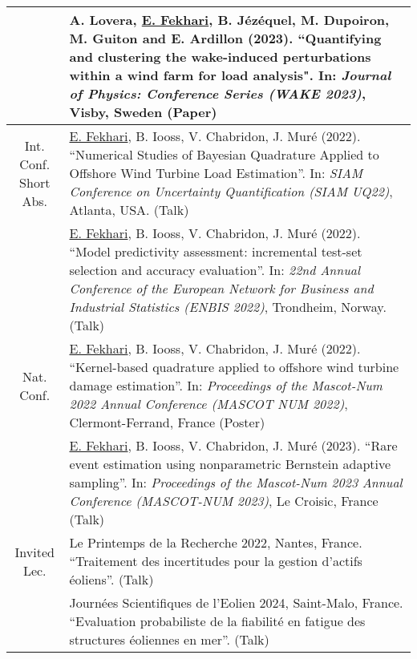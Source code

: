 \begin{center}
\begin{tabularx}{\textwidth}{c X}
                    & A. Lovera, \underline{E. Fekhari}, B. Jézéquel, M. Dupoiron, M. Guiton and E. Ardillon (2023). 
                    ``Quantifying and clustering the wake-induced perturbations within a wind farm for load analysis". 
                    In: \textit{Journal of Physics: Conference Series (WAKE 2023)}, Visby, Sweden (Paper)\\
        \hline
\shortstack{Int. Conf.\\Short Abs.}  & \underline{E. Fekhari}, B. Iooss, V. Chabridon, J. Muré (2022).
                    ``Numerical Studies of Bayesian Quadrature Applied to Offshore Wind Turbine Load Estimation''.
                    In: \textit{SIAM Conference on Uncertainty Quantification (SIAM UQ22)}, Atlanta, USA. (Talk)\\
        
                    & \underline{E. Fekhari}, B. Iooss, V. Chabridon, J. Muré (2022). 
                    ``Model predictivity assessment: incremental test-set selection and accuracy evaluation''.
                    In: \textit{22nd Annual Conference of the European Network for Business and Industrial Statistics (ENBIS 2022)}, Trondheim, Norway. (Talk)\\
        \hline
        Nat. Conf.  & \underline{E. Fekhari}, B. Iooss, V. Chabridon, J. Muré (2022).
                    ``Kernel-based quadrature applied to offshore wind turbine damage estimation''. 
                    In: \textit{Proceedings of the Mascot-Num 2022 Annual Conference (MASCOT NUM 2022)}, Clermont-Ferrand, France (Poster)\\
        
                    & \underline{E. Fekhari}, B. Iooss, V. Chabridon, J. Muré (2023).
                    ``Rare event estimation using nonparametric Bernstein adaptive sampling''. 
                    In: \textit{Proceedings of the Mascot-Num 2023 Annual Conference (MASCOT-NUM 2023)}, Le Croisic, France (Talk)\\
        \hline
        Invited Lec.& Le Printemps de la Recherche 2022, Nantes, France. ``Traitement des incertitudes pour la gestion d’actifs éoliens''. (Talk)\\

                    & Journées Scientifiques de l’Eolien 2024, Saint-Malo, France. ``Evaluation probabiliste de la fiabilité en fatigue des structures éoliennes en mer''. (Talk)
                    
        \end{tabularx}    
\end{center}

